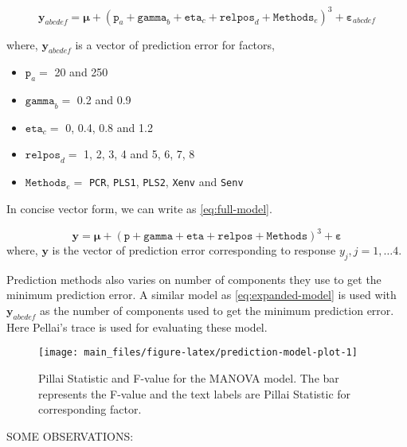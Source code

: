 \documentclass[12pt,3p,authoryear]{elsarticle}
\providecommand{\tightlist}{%
  \setlength{\itemsep}{0pt}\setlength{\parskip}{0pt}}
\begin{document}
\begin{equation}
\mathbf{y}_{abcdef} = \boldsymbol{\mu} + (\texttt{p}_a + \texttt{gamma}_b + \texttt{eta}_c + \texttt{relpos}_d + \texttt{Methods}_e)^3 + \boldsymbol{\varepsilon}_{abcdef}
\label{eq:expanded-model}
\end{equation}

where, \(\mathbf{y}_{abcdef}\) is a vector of prediction error for
factors,

\begin{itemize}
\tightlist
\item
  \(\texttt{p}_a =\) 20 and 250
\item
  \(\texttt{gamma}_b=\) 0.2 and 0.9
\item
  \(\texttt{eta}_c=\) 0, 0.4, 0.8 and 1.2
\item
  \(\texttt{relpos}_d=\) 1, 2, 3, 4 and 5, 6, 7, 8
\item
  \(\texttt{Methods}_e=\) \texttt{PCR}, \texttt{PLS1}, \texttt{PLS2},
  \texttt{Xenv} and \texttt{Senv}
\end{itemize}

In concise vector form, we can write as \eqref{eq:full-model}.

\begin{equation}
\mathbf{y} = \boldsymbol{\mu} + (\texttt{p} + \texttt{gamma} + \texttt{eta} + \texttt{relpos} + \texttt{Methods})^3 + \boldsymbol{\varepsilon}
\label{eq:full-model}
\end{equation} where, \(\mathbf{y}\) is the vector of prediction error
corresponding to response \(y_j, j = 1, \ldots 4\).

Prediction methods also varies on number of components they use to get
the minimum prediction error. A similar model as \eqref{eq:expanded-model}
is used with \(\mathbf{y}_{abcdef}\) as the number of components used to
get the minimum prediction error. Here Pellai's trace is used for
evaluating these model.

\begin{figure}
\texttt{[image: main\_files/figure-latex/prediction-model-plot-1]} \caption{Pillai Statistic and F-value for the MANOVA model. The bar represents the F-value and the text labels are Pillai Statistic for corresponding factor.}\label{fig:prediction-model-plot}
\end{figure}

SOME OBSERVATIONS:
\end{document}
